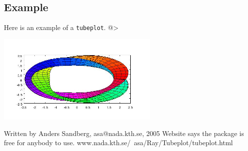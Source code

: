 \subsection{Example}

Here is an example of a \verb|tubeplot|.
@>


\centerline{\includegraphics[width=8cm]{tubeplot1}}


 Written by Anders Sandberg, asa@nada.kth.se, 2005
 Website says the package is free for anybody to use.
 www.nada.kth.se/~asa/Ray/Tubeplot/tubeplot.html
